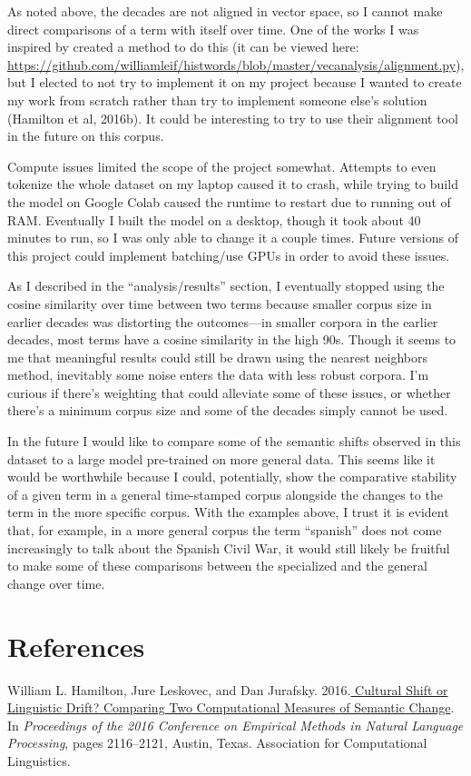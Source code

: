 \documentclass[11pt]{article}
\begin{document}
As noted above, the decades are not aligned in vector space, so I cannot make direct comparisons of a term with itself over time. One of the works I was inspired by created a method to do this (it can be viewed here: \href{https://github.com/williamleif/histwords/blob/master/vecanalysis/alignment.py}{https://github.com/williamleif/histwords/blob/master/vecanalysis/alignment.py}), but I elected to not try to implement it on my project because I wanted to create my work from scratch rather than try to implement someone else’s solution (Hamilton et al, 2016b). It could be interesting to try to use their alignment tool in the future on this corpus.

Compute issues limited the scope of the project somewhat. Attempts to even tokenize the whole dataset on my laptop caused it to crash, while trying to build the model on Google Colab caused the runtime to restart due to running out of RAM. Eventually I built the model on a desktop, though it took about 40 minutes to run, so I was only able to change it a couple times. Future versions of this project could implement batching/use GPUs in order to avoid these issues.

As I described in the “analysis/results” section, I eventually stopped using the cosine similarity over time between two terms because smaller corpus size in earlier decades was distorting the outcomes—in smaller corpora in the earlier decades, most terms have a cosine similarity in the high 90s. Though it seems to me that meaningful results could still be drawn using the nearest neighbors method, inevitably some noise enters the data with less robust corpora. I’m curious if there’s weighting that could alleviate some of these issues, or whether there’s a minimum corpus size and some of the decades simply cannot be used. 

In the future I would like to compare some of the semantic shifts observed in this dataset to a large model pre-trained on more general data. This seems like it would be worthwhile because I could, potentially, show the comparative stability of a given term in a general time-stamped corpus alongside the changes to the term in the more specific corpus. With the examples above, I trust it is evident that, for example, in a more general corpus the term “spanish” does not come increasingly to talk about the Spanish Civil War, it would still likely be fruitful to make some of these comparisons between the specialized and the general change over time.


\section*{References}
William L. Hamilton, Jure Leskovec, and Dan Jurafsky. 2016.\href{https://aclanthology.org/D16-1229}{ Cultural Shift or Linguistic Drift? Comparing Two Computational Measures of Semantic Change}. In \textit{Proceedings of the 2016 Conference on Empirical Methods in Natural Language Processing}, pages 2116–2121, Austin, Texas. Association for Computational Linguistics.
\end{document}
